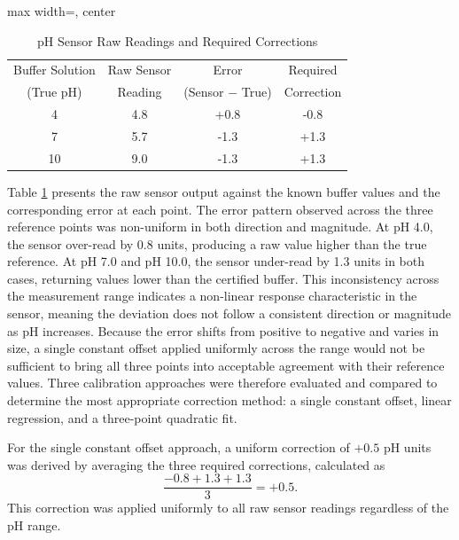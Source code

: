 {	\begin{table}[h]
		\centering
		\caption{pH Sensor Raw Readings and Required Corrections}
		\label{tab:calibration}
		\begin{adjustbox}{max width=\textwidth, center}
			\small 
			\begin{tabular}{cccc}
				\toprule
				Buffer Solution & Raw Sensor & Error & Required \\
				(True pH) & Reading & (Sensor $-$ True) & Correction \\
				\midrule
				4  & 4.8 & +0.8 & -0.8 \\
				7  & 5.7 & -1.3 & +1.3 \\
				10 & 9.0 & -1.3 & +1.3 \\
				\bottomrule
			\end{tabular}
		\end{adjustbox}
	\end{table}
	
	Table \ref{tab:calibration} presents the raw sensor output against the known buffer values and the corresponding error at each point. The error pattern observed across the three reference points was non-uniform in both direction and magnitude. At pH 4.0, the sensor over-read by 0.8 units, producing a raw value higher than the true reference. At pH 7.0 and pH 10.0, the sensor under-read by 1.3 units in both cases, returning values lower than the certified buffer. This inconsistency across the measurement range indicates a non-linear response characteristic in the sensor, meaning the deviation does not follow a consistent direction or magnitude as pH increases. Because the error shifts from positive to negative and varies in size, a single constant offset applied uniformly across the range would not be sufficient to bring all three points into acceptable agreement with their reference values. Three calibration approaches were therefore evaluated and compared to determine the most appropriate correction method: a single constant offset, linear regression, and a three-point quadratic fit.
	
	For the single constant offset approach, a uniform correction of $+0.5$ pH units was derived by averaging the three required corrections, calculated as
	\[
	\frac{-0.8 + 1.3 + 1.3}{3} = +0.5.
	\]
	This correction was applied uniformly to all raw sensor readings regardless of the pH range.
	
}
